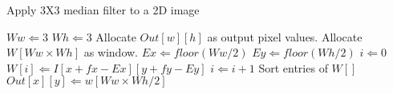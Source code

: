 \begin{algorithm}
\caption{Apply 3X3 median filter to a 2D image}
\begin{algorithmic}[1]
\State $Ww \Leftarrow 3$
\State $Wh \Leftarrow 3$
\State Allocate $Out[w][h]$ as output pixel values.
\State Allocate $W[Ww \times Wh]$ as window.
\State $Ex \Leftarrow floor(Ww / 2)$
\State $Ey \Leftarrow floor(Wh / 2)$
            $i \Leftarrow 0$
                    \State $W[i] \Leftarrow I[x + fx - Ex][y + fy - Ey]$
                    \State $i \Leftarrow i + 1$
                \EndFor
            \EndFor
            \State Sort entries of $W[]$
            \State $Out[x][y] \Leftarrow w[Ww \times Wh / 2]$
        \EndFor
    \EndFor
\end{algorithmic}
\end{algorithm}